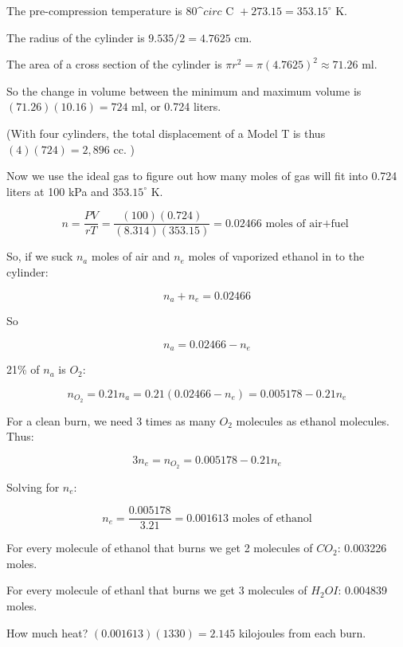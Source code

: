 \begin{Answer}[ref=fuelmix] 

The pre-compression temperature is $80\^circ \text{ C } + 273.15 = 353.15^\circ$ K.

The radius of the cylinder is $9.535/2 =4.7625$ cm.

The area of a cross section of the cylinder is $\pi r^2 = \pi (4.7625)^2 \approx 71.26$ ml.

So the change in volume between the minimum and maximum volume is $ (71.26)(10.16) = 724$ ml, or 0.724 liters.

(With four cylinders,  the total displacement of a Model T is thus $ (4)(724) = 2,896$ cc. )

Now we use the ideal gas to figure out how many moles of gas will fit into 0.724 liters at 100 kPa and $353.15^\circ$ K.

$$n = \frac{PV}{rT} = \frac{(100)(0.724)}{(8.314)(353.15)} = 0.02466 \text{ moles of air+fuel }$$ 

So,  if we suck $n_a$ moles of air and $n_e$ moles of vaporized ethanol in to the cylinder:

$$n_a + n_e = 0.02466$$

So

$$n_a = 0.02466 -  n_e$$

21\% of $n_a$ is $O_2$:

$$n_{O_2} = 0.21 n_a = 0.21 (0.02466 -  n_e) = 0.005178 - 0.21 n_e$$

For a clean burn,  we need 3 times as many $O_2$ molecules as ethanol molecules.  Thus:

$$3 n_e  =   n_{O_2} = 0.005178 - 0.21 n_e$$

Solving for $n_e$:

$$n_e = \frac{0.005178}{3.21}  = 0.001613 \text{ moles  of ethanol}$$

For every molecule of ethanol that burns we get 2 molecules of $CO_2$: 0.003226 moles.

For every molecule of ethanl that burns we get 3 molecules of $H_2OI$: 0.004839 moles.

How much heat?  $(0.001613)(1330) =  2.145$ kilojoules from each burn.

\end{Answer}


